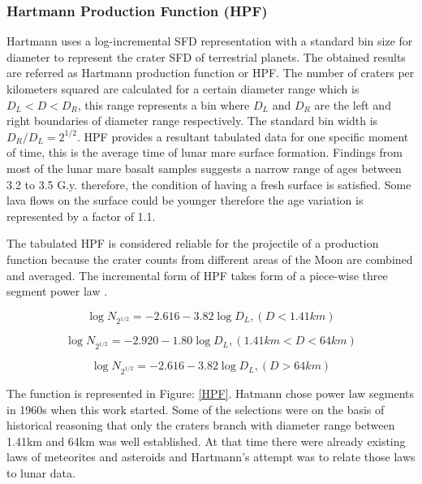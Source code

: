 \documentclass[11pt]{article}
\begin{document}
\subsubsection{Hartmann Production Function (HPF)}
Hartmann uses a log-incremental SFD representation with a standard bin size for diameter to represent the crater SFD of terrestrial planets. The obtained results are referred as Hartmann production function or HPF. The number of craters per kilometers squared are calculated for a certain diameter range which is $D_{L} < D < D_{R}$, this range represents a bin where $D_{L}$ and $D_{R}$ are the left and right boundaries of diameter range respectively. The standard bin width is $D_{R}/D_{L} = 2^{1/2}$. HPF provides a resultant tabulated data for one specific moment of time, this is the average time of lunar mare surface formation. Findings from most of the lunar mare basalt samples suggests a narrow range of ages between 3.2 to 3.5 G.y. \cite{stoffler2001stratigraphy} therefore, the condition of having a fresh surface is satisfied. Some lava flows on the surface could be younger \cite{hiesinger2000ages} therefore the age variation is represented by a factor of 1.1.

The tabulated HPF is considered reliable for the projectile of a production function because the crater counts from different areas of the Moon are combined and averaged. The incremental form of HPF takes form of a piece-wise three segment power law \cite{ivanov2002comparison}.

\begin{equation}
\log N_{2^{1/2}} = -2.616 - 3.82 \log D_{L}, (D<1.41km)
\end{equation}

\begin{equation}
\log N_{2^{1/2}} = -2.920 - 1.80 \log D_{L},
(1.41km < D < 64km)
\end{equation}

\begin{equation}
\log N_{2^{1/2}} = -2.616 - 3.82 \log D_{L},
(D>64km)
\end{equation}

The function is represented in Figure: \ref{HPF}. Hatmann chose power law segments in 1960s when this work started. Some of the selections were on the basis of historical reasoning that only the craters branch with diameter range between 1.41km and 64km was well established. At that time there were already existing laws of meteorites and asteroids and Hartmann's attempt was to relate those laws to lunar data.
\end{document}
